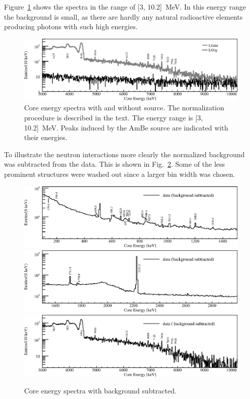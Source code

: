 Figure~\ref{fig:neu:specl} shows the spectra in the range of [3,
10.2]~MeV. In this energy range the background is small, as there are
hardly any natural radioactive elements producing photons with such
high energies.

\begin{figure}[tbhp]
  \centering
  \includegraphics[width=\textwidth,clip]{spectra_3_11MeV}
  \caption{Core energy spectra with and without source. The
    normalization procedure is described in the text. The energy range
    is [3, 10.2]~MeV. Peaks induced by the AmBe source are indicated
    with their energies.}
  \label{fig:neu:specl}
\end{figure}

To illustrate the neutron interactions more clearly the normalized
background was subtracted from the data. This is shown in
Fig.~\ref{fig:neu:specd}. Some of the less prominent structures were
washed out since a larger bin width was chosen.

\begin{figure}[tbhp]
  \centering
  \includegraphics[width=\textwidth,clip]{spectra_0_1d5MeV}
  \includegraphics[width=\textwidth,clip]{spectra_1d5_3MeV}
  \includegraphics[width=\textwidth,clip]{spectra_3_10d2MeV}
  \caption{Core energy spectra with background subtracted.}
  \label{fig:neu:specd}
\end{figure}


